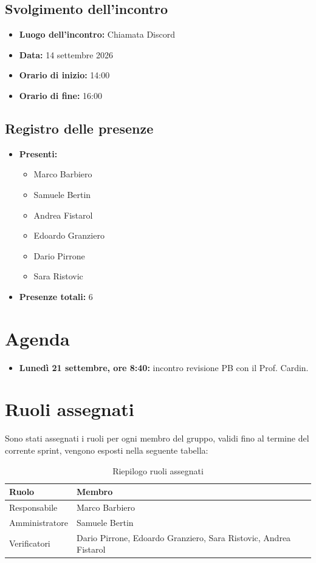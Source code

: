 \documentclass[12pt, a4paper]{article}
\begin{document}
\subsection{Svolgimento dell'incontro}
\begin{itemize}
    \item \textbf{Luogo dell'incontro:} Chiamata Discord
    \item \textbf{Data:} 14 settembre 2026
    \item \textbf{Orario di inizio:} 14:00
    \item \textbf{Orario di fine:} 16:00
\end{itemize}

\subsection{Registro delle presenze}
\begin{itemize}
    \item \textbf{Presenti:}
    \begin{itemize}
        \item Marco Barbiero
        \item Samuele Bertin
        \item Andrea Fistarol
        \item Edoardo Granziero
        \item Dario Pirrone
        \item Sara Ristovic
    \end{itemize}
    \item \textbf{Presenze totali:} 6
\end{itemize}

\section{Agenda}
\begin{itemize}
    \item \textbf{Lunedì 21 settembre, ore 8:40:} incontro revisione PB con il Prof. Cardin.
\end{itemize}

\newpage
\section{Ruoli assegnati}
Sono stati assegnati i ruoli per ogni membro del gruppo, validi fino al termine del corrente
sprint, vengono esposti nella seguente tabella:


\begin{table}[htbp]
    \centering
    \renewcommand{\arraystretch}{1.3}
    \begin{tabularx}{\textwidth}{|l|X|}
        \hline
        \textbf{Ruolo} & \textbf{Membro} \\ \hline
        Responsabile & Marco Barbiero \\ \hline
        Amministratore & Samuele Bertin \\ \hline
        Verificatori & Dario Pirrone, Edoardo Granziero, Sara Ristovic, Andrea Fistarol \\ \hline
    \end{tabularx}
    \caption{Riepilogo ruoli assegnati}
\end{table}
\end{document}
